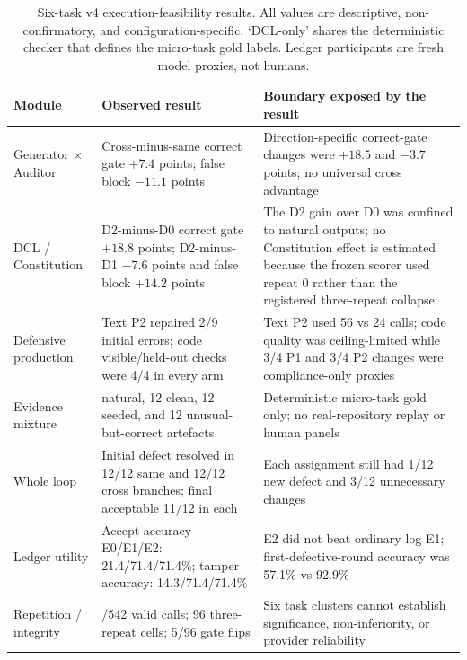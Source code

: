 \documentclass[11pt]{article}
\begin{document}
\begin{table}[h]
\centering\footnotesize\setlength{\tabcolsep}{3pt}
\caption{Six-task v4 execution-feasibility results. All values are descriptive, non-confirmatory, and configuration-specific. `DCL-only' shares the deterministic checker that defines the micro-task gold labels. Ledger participants are fresh model proxies, not humans.}
\label{tab:v4feasibility}
\begin{tabular}{@{}>{\raggedright\arraybackslash}p{27mm}>{\raggedright\arraybackslash}p{55mm}>{\raggedright\arraybackslash}p{62mm}@{}}
\toprule
Module & Observed result & Boundary exposed by the result \\
\midrule
Generator $\times$ Auditor & Cross-minus-same correct gate $+7.4$ points; false block $-11.1$ points & Direction-specific correct-gate changes were $+18.5$ and $-3.7$ points; no universal cross advantage \\
DCL / Constitution & D2-minus-D0 correct gate $+18.8$ points; D2-minus-D1 $-7.6$ points and false block $+14.2$ points & The D2 gain over D0 was confined to natural outputs; no Constitution effect is estimated because the frozen scorer used repeat 0 rather than the registered three-repeat collapse \\
Defensive production & Text P2 repaired 2/9 initial errors; code visible/held-out checks were 4/4 in every arm & Text P2 used 56 vs 24 calls; code quality was ceiling-limited while 3/4 P1 and 3/4 P2 changes were compliance-only proxies \\
Evidence mixture & 12 natural, 12 clean, 12 seeded, and 12 unusual-but-correct artefacts & Deterministic micro-task gold only; no real-repository replay or human panels \\
Whole loop & Initial defect resolved in 12/12 same and 12/12 cross branches; final acceptable 11/12 in each & Each assignment still had 1/12 new defect and 3/12 unnecessary changes \\
Ledger utility & Accept accuracy E0/E1/E2: 21.4/71.4/71.4\%; tamper accuracy: 14.3/71.4/71.4\% & E2 did not beat ordinary log E1; first-defective-round accuracy was 57.1\% vs 92.9\% \\
Repetition / integrity & 542/542 valid calls; 96 three-repeat cells; 5/96 gate flips & Six task clusters cannot establish significance, non-inferiority, or provider reliability \\
\bottomrule
\end{tabular}
\end{table}
\end{document}
